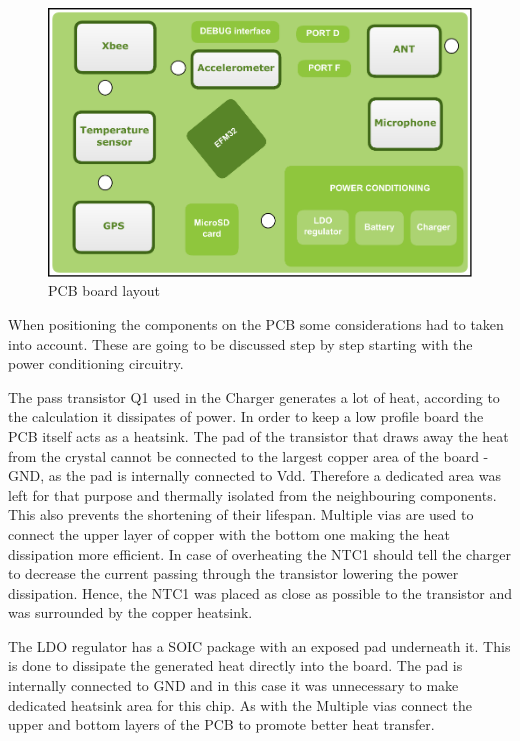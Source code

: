 \begin{figure}[!htb]
\centering
\includegraphics[width=\textwidth]{Images/board_layout}
\caption{PCB board layout}
\label{fig:board_layout}
\end{figure}

When positioning the components on the PCB some considerations had to taken into account. These are going to be discussed step by step starting with the power conditioning circuitry. 

The pass transistor Q1 used in the Charger generates a lot of heat, according to the calculation it dissipates  of power. In order to keep a low profile board the PCB itself acts as a heatsink. The pad of the transistor that draws away the heat from the crystal cannot be connected to the largest copper area of the board - GND, as the pad is internally connected to Vdd. Therefore a dedicated area was left for that purpose and thermally isolated from the neighbouring components. This also prevents the shortening of their lifespan. Multiple vias are used to connect the upper layer of copper with the bottom one making the heat dissipation more efficient. In case of overheating the NTC1 should tell the charger to decrease the current passing through the transistor lowering the power dissipation. Hence, the NTC1 was placed as close as possible to the transistor and was surrounded by the copper heatsink.

The LDO regulator has a SOIC package with an exposed pad underneath it. This is done to dissipate the generated heat directly into the board. The pad is internally connected to GND and in this case it was unnecessary to make dedicated heatsink area for this chip. As with the Multiple vias connect the upper and bottom layers of the PCB to promote better heat transfer.

